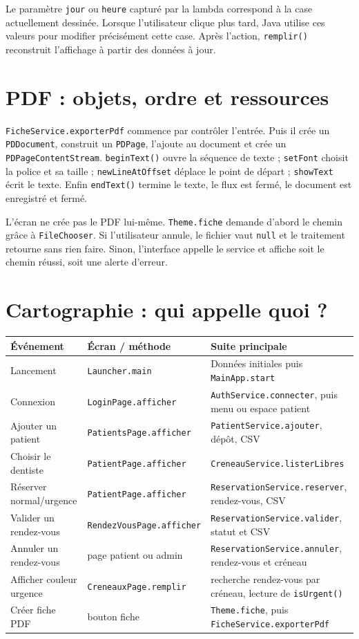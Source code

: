 \documentclass[11pt,a4paper]{report}
\begin{document}
Le paramètre \texttt{jour} ou \texttt{heure} capturé par la lambda correspond à la case actuellement dessinée. Lorsque l'utilisateur clique plus tard, Java utilise ces valeurs pour modifier précisément cette case. Après l'action, \texttt{remplir()} reconstruit l'affichage à partir des données à jour.

\section{PDF : objets, ordre et ressources}
\texttt{FicheService.exporterPdf} commence par contrôler l'entrée. Puis il crée un \texttt{PDDocument}, construit un \texttt{PDPage}, l'ajoute au document et crée un \texttt{PDPageContentStream}. \texttt{beginText()} ouvre la séquence de texte ; \texttt{setFont} choisit la police et sa taille ; \texttt{newLineAtOffset} déplace le point de départ ; \texttt{showText} écrit le texte. Enfin \texttt{endText()} termine le texte, le flux est fermé, le document est enregistré et fermé.

L'écran ne crée pas le PDF lui-même. \texttt{Theme.fiche} demande d'abord le chemin grâce à \texttt{FileChooser}. Si l'utilisateur annule, le fichier vaut \texttt{null} et le traitement retourne sans rien faire. Sinon, l'interface appelle le service et affiche soit le chemin réussi, soit une alerte d'erreur.

\section{Cartographie : qui appelle quoi ?}
\begin{longtable}{p{}p{}p{}}
\textbf{Événement} & \textbf{Écran / méthode} & \textbf{Suite principale} \\\hline
Lancement & \texttt{Launcher.main} & Données initiales puis \texttt{MainApp.start} \\
Connexion & \texttt{LoginPage.afficher} & \texttt{AuthService.connecter}, puis menu ou espace patient \\
Ajouter un patient & \texttt{PatientsPage.afficher} & \texttt{PatientService.ajouter}, dépôt, CSV \\
Choisir le dentiste & \texttt{PatientPage.afficher} & \texttt{CreneauService.listerLibres} \\
Réserver normal/urgence & \texttt{PatientPage.afficher} & \texttt{ReservationService.reserver}, rendez-vous, CSV \\
Valider un rendez-vous & \texttt{RendezVousPage.afficher} & \texttt{ReservationService.valider}, statut et CSV \\
Annuler un rendez-vous & page patient ou admin & \texttt{ReservationService.annuler}, rendez-vous et créneau \\
Afficher couleur urgence & \texttt{CreneauxPage.remplir} & recherche rendez-vous par créneau, lecture de \texttt{isUrgent()} \\
Créer fiche PDF & bouton fiche & \texttt{Theme.fiche}, puis \texttt{FicheService.exporterPdf} \\
\end{longtable}
\end{document}
